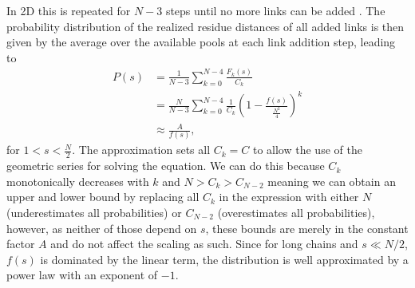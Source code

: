 \documentclass[
reprint,
twocolumn,
amsmath,amssymb,superscriptaddress,aps,
pre]{revtex4-1}
\newcommand{\red}[1]{\textcolor{red!80!black}{#1}}
\newcommand{\blue}[1]{\textcolor{blue!80!black}{#1}}
\begin{document}
\blue{In 2D this is repeated for $N-3$ steps until no more links can be added \cite{molkenthin2016scaling}.}
The probability distribution of the realized residue distances of all added links is then given by the average over the available pools at each link addition step, leading to
\blue{\begin{align}
    P(s)&=\frac{1}{N-3}\sum_{k=0}^{N-4} \frac{F_k(s)}{C_k} \nonumber \\
    &= \frac{N}{N-3}\sum_{k=0}^{N-4} \frac{1}{C_k} \left(1-\frac{f(s)}{\frac{N^2}{4}} \right)^k \nonumber \\
    &\approx \frac{A}{f(s)},
    \label{eq.Ps}
\end{align}}
\blue{for $1<s<\frac{N}{2}$. The approximation sets all $C_k=C$ to allow the use of the geometric series for solving the equation. We can do this because $C_k$ monotonically decreases with $k$ and $N>C_k>C_{N-2}$ meaning we can obtain an upper and lower bound by replacing all $C_k$ in the expression with either $N$ (underestimates all probabilities) or $C_{N-2}$ (overestimates all probabilities), however, as neither of those depend on $s$, these bounds are merely in the constant factor $A$ and do not affect the scaling as such.}
\blue{Since for long chains and $s \ll N/2$, $f(s)$ is dominated by the linear term, the distribution is well approximated by a power law with an exponent of $-1$.}
\end{document}

